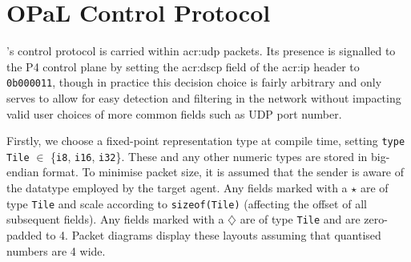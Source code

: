 \chapter{OPaL Control Protocol}
\label{adx:opal-proto}

\approachshort{}'s control protocol is carried within \gls{acr:udp} packets.
Its presence is signalled to the P4 control plane by setting the \gls{acr:dscp} field of the \gls{acr:ip} header to \texttt{0b000011}, though in practice this decision choice is fairly arbitrary and only serves to allow for easy detection and filtering in the network without impacting valid user choices of more common fields such as UDP port number.

Firstly, we choose a fixed-point representation type at compile time, setting \texttt{type Tile} $\in$ \{\texttt{i8}, \texttt{i16}, \texttt{i32}\}.
These and any other numeric types are stored in big-endian format.
To minimise packet size, it is assumed that the sender is aware of the datatype employed by the target \approachshort{} agent.
Any fields marked with a $\star$ are of type \texttt{Tile} and scale according to \texttt{sizeof(Tile)} (affecting the offset of all subsequent fields).
Any fields marked with a $\diamondsuit$ are of type \texttt{Tile} and are zero-padded to \qty{4}{\byte}.
Packet diagrams display these layouts assuming that quantised numbers are \qty{4}{\byte} wide.

